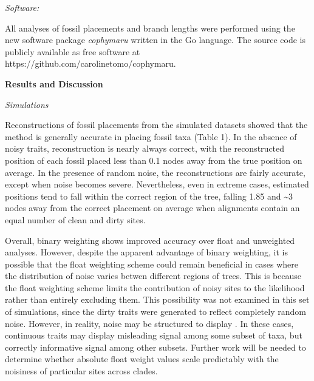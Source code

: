 \documentclass[12pt]{article}
\begin{document}
\noindent\emph{Software:}

All analyses of fossil placements and branch lengths were performed
using the new software package \emph{cophymaru} written in the Go
language. The source code is publicly available as free software at
https://github.com/carolinetomo/cophymaru.

\noindent\textbf{Results and Discussion}

\noindent\emph{Simulations}

Reconstructions of fossil placements from the simulated datasets showed
that the method is generally accurate in placing fossil taxa (Table 1).
In the absence of noisy traits, reconstruction is nearly always correct,
with the reconstructed position of each fossil placed less than 0.1
nodes away from the true position on average. In the presence of random
noise, the reconstructions are fairly accurate, except when noise
becomes severe. Nevertheless, even in extreme cases, estimated positions
tend to fall within the correct region of the tree, falling 1.85 and
\textasciitilde{}3 nodes away from the correct placement on average when
alignments contain an equal number of clean and dirty sites.

Overall, binary weighting shows improved accuracy over float and
unweighted analyses. However, despite the apparent advantage of binary
weighting, it is possible that the float weighting scheme could remain
beneficial in cases where the distribution of noise varies betwen
different regions of trees. This is because the float weighting scheme
limits the contribution of noisy sites to the likelihood rather than
entirely excluding them. This possibility was not examined in this set
of simulations, since the dirty traits were generated to reflect
completely random noise. However, in reality, noise may be structured to
display . In these cases, continuous traits may display misleading
signal among some subset of taxa, but correctly informative signal among
other subsets. Further work will be needed to determine whether absolute
float weight values scale predictably with the noisiness of particular
sites across clades.
\end{document}
